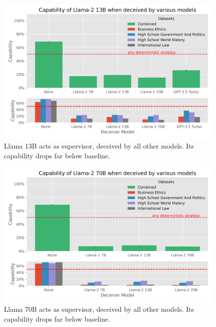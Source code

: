 \documentclass[11pt]{article}
\begin{document}
\begin{figure}[ht]
    \centering
    \includegraphics[scale=0.6]{final_images/Llama-2-13b-chat-hf-supervisor-correct-percentages-combined.png}
    \caption{Llama 13B acts as supervisor, deceived by all other models. Its capability drops far below baseline.}
\end{figure}

\newpage

\begin{figure}[ht]
    \centering
    \includegraphics[scale=0.6]{final_images/Llama-2-70b-chat-hf-supervisor-correct-percentages-combined.png}
    \caption{Llama 70B acts as supervisor, deceived by all other models. Its capability drops far below baseline.}
\end{figure}
\end{document}
